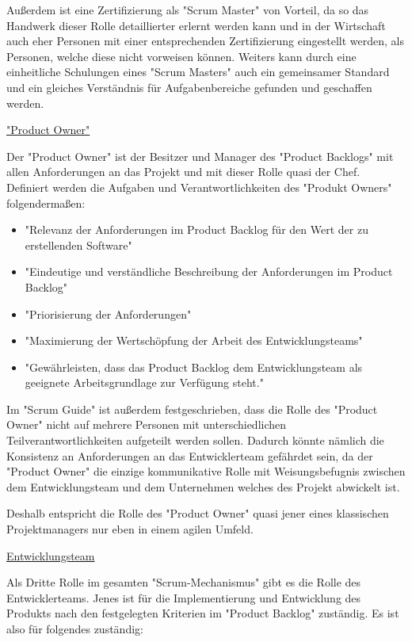 Außerdem ist eine Zertifizierung als "Scrum Master" von Vorteil, da so das Handwerk dieser Rolle detaillierter erlernt werden kann und in der Wirtschaft auch eher Personen mit einer entsprechenden Zertifizierung eingestellt werden, als Personen, welche diese nicht vorweisen können. Weiters kann durch eine einheitliche Schulungen eines "Scrum Masters" auch ein gemeinsamer Standard und ein gleiches Verständnis für Aufgabenbereiche gefunden und geschaffen werden. \cite{ScrumMaster}

\underline{"Product Owner"}

Der "Product Owner" ist der Besitzer und Manager des "Product Backlogs" mit allen Anforderungen an das Projekt und mit dieser Rolle quasi der Chef. Definiert werden die Aufgaben und Verantwortlichkeiten des "Produkt Owners" folgendermaßen:

\begin{itemize}
    \item "Relevanz der Anforderungen im Product Backlog für den Wert der zu erstellenden Software" \cite{ProductOwner}
    \item "Eindeutige und verständliche Beschreibung der Anforderungen im Product Backlog" \cite{ProductOwner}
    \item "Priorisierung der Anforderungen" \cite{ProductOwner}
    \item "Maximierung der Wertschöpfung der Arbeit des Entwicklungsteams" \cite{ProductOwner}
    \item "Gewährleisten, dass das Product Backlog dem Entwicklungsteam als geeignete Arbeitsgrundlage zur Verfügung steht." \cite{ProductOwner}
\end{itemize}

Im "Scrum Guide" ist außerdem festgeschrieben, dass die Rolle des "Product Owner" nicht auf mehrere Personen mit unterschiedlichen Teilverantwortlichkeiten aufgeteilt werden sollen. Dadurch könnte nämlich die Konsistenz an Anforderungen an das Entwicklerteam gefährdet sein, da der "Product Owner" die einzige kommunikative Rolle mit Weisungsbefugnis zwischen dem Entwicklungsteam und dem Unternehmen welches des Projekt abwickelt ist.

Deshalb entspricht die Rolle des "Product Owner" quasi jener eines klassischen Projektmanagers nur eben in einem agilen Umfeld.

\underline{Entwicklungsteam}

Als Dritte Rolle im gesamten "Scrum-Mechanismus" gibt es die Rolle des Entwicklerteams. Jenes ist für die Implementierung und Entwicklung des Produkts nach den festgelegten Kriterien im "Product Backlog" zuständig. Es ist also für folgendes zuständig:

